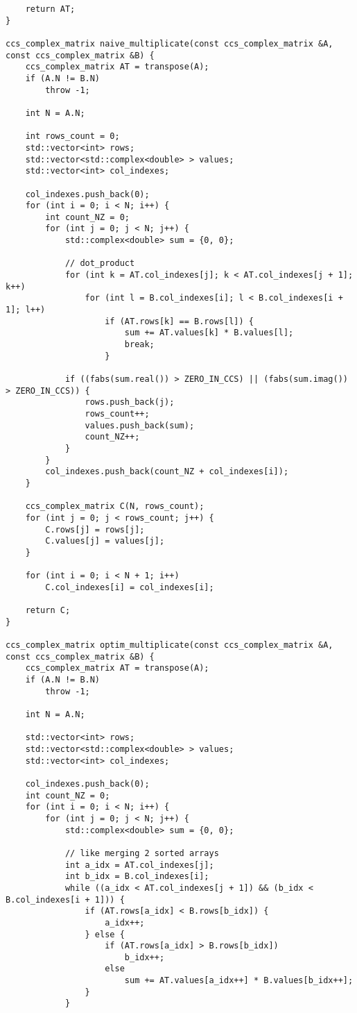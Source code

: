 \documentclass{report}
\begin{document}
\begin{lstlisting}
    return AT;
}

ccs_complex_matrix naive_multiplicate(const ccs_complex_matrix &A, const ccs_complex_matrix &B) {
    ccs_complex_matrix AT = transpose(A);
    if (A.N != B.N)
        throw -1;

    int N = A.N;

    int rows_count = 0;
    std::vector<int> rows;
    std::vector<std::complex<double> > values;
    std::vector<int> col_indexes;

    col_indexes.push_back(0);
    for (int i = 0; i < N; i++) {
        int count_NZ = 0;
        for (int j = 0; j < N; j++) {
            std::complex<double> sum = {0, 0};

            // dot_product
            for (int k = AT.col_indexes[j]; k < AT.col_indexes[j + 1]; k++)
                for (int l = B.col_indexes[i]; l < B.col_indexes[i + 1]; l++)
                    if (AT.rows[k] == B.rows[l]) {
                        sum += AT.values[k] * B.values[l];
                        break;
                    }

            if ((fabs(sum.real()) > ZERO_IN_CCS) || (fabs(sum.imag()) > ZERO_IN_CCS)) {
                rows.push_back(j);
                rows_count++;
                values.push_back(sum);
                count_NZ++;
            }
        }
        col_indexes.push_back(count_NZ + col_indexes[i]);
    }

    ccs_complex_matrix C(N, rows_count);
    for (int j = 0; j < rows_count; j++) {
        C.rows[j] = rows[j];
        C.values[j] = values[j];
    }

    for (int i = 0; i < N + 1; i++)
        C.col_indexes[i] = col_indexes[i];

    return C;
}

ccs_complex_matrix optim_multiplicate(const ccs_complex_matrix &A, const ccs_complex_matrix &B) {
    ccs_complex_matrix AT = transpose(A);
    if (A.N != B.N)
        throw -1;

    int N = A.N;

    std::vector<int> rows;
    std::vector<std::complex<double> > values;
    std::vector<int> col_indexes;

    col_indexes.push_back(0);
    int count_NZ = 0;
    for (int i = 0; i < N; i++) {
        for (int j = 0; j < N; j++) {
            std::complex<double> sum = {0, 0};

            // like merging 2 sorted arrays
            int a_idx = AT.col_indexes[j];
            int b_idx = B.col_indexes[i];
            while ((a_idx < AT.col_indexes[j + 1]) && (b_idx < B.col_indexes[i + 1])) {
                if (AT.rows[a_idx] < B.rows[b_idx]) {
                    a_idx++;
                } else {
                    if (AT.rows[a_idx] > B.rows[b_idx])
                        b_idx++;
                    else
                        sum += AT.values[a_idx++] * B.values[b_idx++];
                }
            }


\end{lstlisting}
\end{document}
